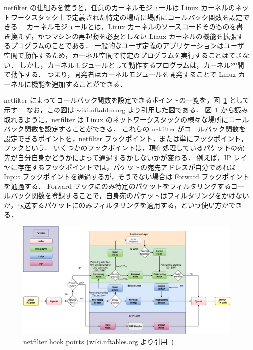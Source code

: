 netfilter の仕組みを使うと，任意のカーネルモジュールは Linux カーネルのネットワークスタック上で定義された特定の場所に場所にコールバック関数を設定できる．
カーネルモジュールとは，Linux カーネルのソースコードそのものを書き換えず，かつマシンの再起動を必要としない Linux カーネルの機能を拡張するプログラムのことである．
一般的なユーザ定義のアプリケーションはユーザ空間で動作するため，カーネル空間で特定のプログラムを実行することはできない．
しかし，カーネルモジュールとして動作するプログラムは，カーネル空間で動作する．
つまり，開発者はカーネルモジュールを開発することで Linux カーネルに機能を追加することができる．

netfilter によってコールバック関数を設定できるポイントの一覧を，図~\ref*{fig:nf-hooks} として示す．
なお，この図は wiki.nftables.org より引用した図である．
図~\ref*{fig:nf-hooks} から読み取れるように，netfilter は Linux のネットワークスタックの様々な場所にコールバック関数を設定することができる．
これらの netfilter がコールバック関数を設定できるポイントを，netfilter フックポイント，または単にフックポイント，フックという．
いくつかのフックポイントは，現在処理しているパケットの宛先が自分自身かどうかによって通過するかしないかが変わる．
例えば，IP レイヤに存在するフックポイントでは，パケットの宛先アドレスが自分であれば Input フックポイントを通過するが，そうでない場合は Forward フックポイントを通過する．
Forward フックにのみ特定のパケットをフィルタリングするコールバック関数を登録することで，自身宛のパケットはフィルタリングをかけないが，転送するパケットにのみフィルタリングを適用する，という使い方ができる．

\begin{figure}[t]
    \centering
    \includegraphics[width=0.95\linewidth]{img/nf-hooks.pdf}
    \caption{netfilter hook points (wiki.nftables.org より引用~\cite{nf-hooks})}
    \label{fig:nf-hooks}
\end{figure}

